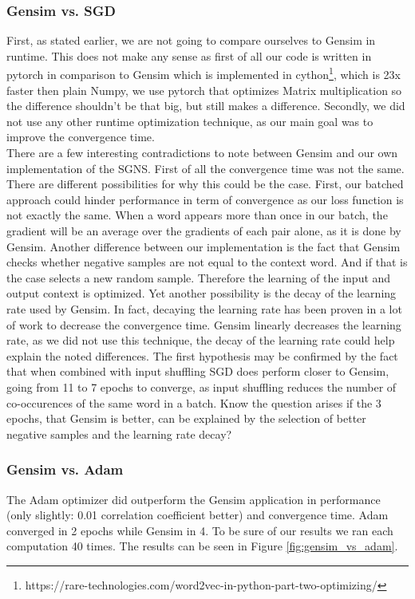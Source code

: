 \subsubsection{Gensim vs. SGD}
First, as stated earlier, we are not going to compare ourselves to Gensim in runtime. This does not make any sense as first of all our code is written in pytorch in comparison to Gensim which is implemented in cython\footnote{https://rare-technologies.com/word2vec-in-python-part-two-optimizing/}, which is 23x faster then plain Numpy, we use pytorch that optimizes Matrix multiplication so the difference shouldn't be that big, but still makes a difference. Secondly, we did not use any other runtime optimization technique, as our main goal was to improve the convergence time.\\
There are a few interesting contradictions to note between Gensim and our own implementation of the SGNS. First of all the convergence time was not the same. There are different possibilities for why this could be the case. First, our batched approach could hinder performance in term of convergence as our loss function is not exactly the same. When a word appears more than once in our batch, the gradient will be an average over the gradients of each pair alone, as it is done by Gensim. Another difference between our implementation is the fact that Gensim checks whether negative samples are not equal to the context word. And if that is the case selects a new random sample. Therefore the learning of the input and output context is optimized. Yet another possibility is the decay of the learning rate used by Gensim. In fact, decaying the learning rate has been proven in a lot of work to decrease the convergence time. Gensim linearly decreases the learning rate, as we did not use this technique, the decay of the learning rate could help explain the noted differences.
The first hypothesis may be confirmed by the fact that when combined with input shuffling SGD does perform closer to Gensim, going from 11 to 7 epochs to converge, as input shuffling reduces the number of co-occurences of the same word in a batch. Know the question arises if the 3 epochs, that Gensim is better, can be explained by the selection of better negative samples and the learning rate decay?

\subsubsection{Gensim vs. Adam}
The Adam optimizer did outperform the Gensim application in performance (only slightly: 0.01 correlation coefficient better) and convergence time. Adam converged in 2 epochs while Gensim in 4. To be sure of our results we ran each computation 40 times. The results can be  seen in Figure \ref{fig:gensim_vs_adam}.

